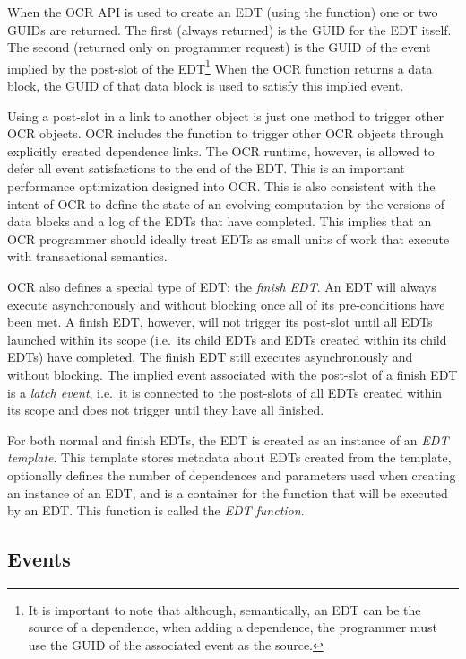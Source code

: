 When the OCR API is used to create an EDT (using the  function)
one or two GUIDs are returned. The first (always returned) is the GUID
for the EDT itself. The second (returned only on programmer request)
is the GUID of the event implied by the post-slot of the EDT\footnote{It is important to
note that although, semantically, an EDT can be the source of a
dependence, when adding a dependence, the programmer must use the
GUID of the associated event as the source.}
When the OCR function returns a data block, the GUID of
that data block is used to satisfy this implied event.

Using a post-slot in a link to another object is just one method to
trigger other OCR objects. OCR includes the 
function to trigger other OCR objects through explicitly created dependence
links. The OCR runtime, however, is allowed to defer all event satisfactions
to the end of the EDT. This is an important performance optimization designed
into OCR. This is also consistent with the intent of OCR to define the state
of an evolving computation by the versions of data blocks and a log of the
EDTs that have completed. This implies that an OCR programmer should
ideally treat EDTs as small units of work that execute with transactional
semantics.

OCR also defines a special type of EDT; the \emph{finish
EDT}. An EDT will always execute asynchronously and
without blocking once all of its pre-conditions have been met. A
finish EDT, however, will not trigger its post-slot until all EDTs
launched within its scope (i.e.\ its child EDTs and EDTs created
within its child EDTs) have completed. The finish EDT still executes
asynchronously and without blocking. The implied event associated with
the post-slot of a finish EDT is a \emph{latch event}, i.e.\ it is
connected to the post-slots of all EDTs created within its scope and
does not trigger until they have all finished.

For both normal and finish EDTs, the EDT is created as an
instance of an \emph{EDT template}. This template stores metadata about EDTs created from the
template, optionally defines the number of dependences and parameters
used when creating an instance of an EDT, and is a container for the
function that will be executed by an EDT. This function is called the
\emph{EDT function}.

\subsection{Events}
\label{sec:Event}

